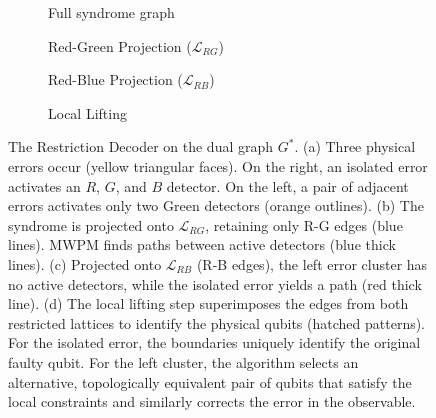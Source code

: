 \begin{figure}[H]
    \centering
    \begin{subfigure}[b]{0.45\textwidth}
        \centering
        \resizebox{\linewidth}{!}{}
        \caption{Full syndrome graph}
    \end{subfigure}
    \hfill
    \begin{subfigure}[b]{0.45\textwidth}
        \centering
        \resizebox{\linewidth}{!}{}
        \caption{Red-Green Projection ($\mathcal{L}_{RG}$)}
    \end{subfigure}

    \vspace{0.5cm}

    \begin{subfigure}[b]{0.45\textwidth}
        \centering
        \resizebox{\linewidth}{!}{}
        \caption{Red-Blue Projection ($\mathcal{L}_{RB}$)}
    \end{subfigure}
    \hfill
    \begin{subfigure}[b]{0.45\textwidth}
        \centering
        \resizebox{\linewidth}{!}{}
        \caption{Local Lifting}
    \end{subfigure}
    \caption[Restriction decoding on the dual graph]{The Restriction Decoder on the dual graph $G^*$. (a) Three physical errors occur (yellow triangular faces). On the right, an isolated error activates an $R$, $G$, and $B$ detector. On the left, a pair of adjacent errors activates only two Green detectors (orange outlines). (b) The syndrome is projected onto $\mathcal{L}_{RG}$, retaining only R-G edges (blue lines). MWPM finds paths between active detectors (blue thick lines). (c) Projected onto $\mathcal{L}_{RB}$ (R-B edges), the left error cluster has no active detectors, while the isolated error yields a path (red thick line). (d) The local lifting step superimposes the edges from both restricted lattices to identify the physical qubits (hatched patterns). For the isolated error, the boundaries uniquely identify the original faulty qubit. For the left cluster, the algorithm selects an alternative, topologically equivalent pair of qubits that satisfy the local constraints and similarly corrects the error in the observable.}
    \label{fig:restriction_decoder_steps}
\end{figure}


